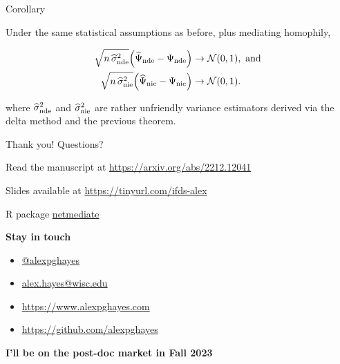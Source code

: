 \documentclass{beamer}
\theoremstyle{remark}
\begin{document}
\begin{frame}{Corollary}

    \begin{theorem}

        \vspace{2mm}

        Under the same statistical assumptions as before, plus mediating homophily,

        \begin{align*}
            \sqrt{n \, \sigmahatnde} \paren*{\ndehat - \nde}
             & \to
            \Normal{0}{1}, \text { and } \\
            \sqrt{n \, \sigmahatnie} \paren*{\niehat - \nie}
             & \to
            \Normal{0}{1}.
        \end{align*}

        \noindent where $\widehat{\sigma}^2_\mathrm{nde}$ and $\widehat{\sigma}^2_\mathrm{nie}$ are rather unfriendly variance estimators derived via the delta method and the previous theorem.

    \end{theorem}

\end{frame}

\begin{frame}{Thank you! Questions?}

    Read the manuscript at \url{https://arxiv.org/abs/2212.12041}

    Slides available at \url{https://tinyurl.com/ifds-alex}

    R package \href{https://github.com/alexpghayes/netmediate}{netmediate}

    \textbf{Stay in touch}

    \begin{itemize}
        \item[]  \href{https://twitter.com/alexpghayes}{@alexpghayes}
        \item[]  \href{mailto:alex.hayes@wisc.edu}{alex.hayes@wisc.edu}
        \item[]  \url{https://www.alexpghayes.com} %
        \item[]  \url{https://github.com/alexpghayes}
    \end{itemize}

    \textbf{I'll be on the post-doc market in Fall 2023}
\end{frame}
\end{document}
